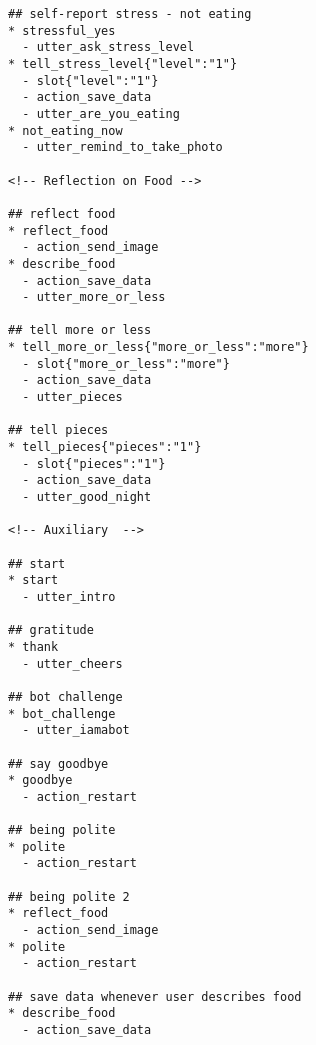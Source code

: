 \begin{lstlisting}
## self-report stress - not eating
* stressful_yes
  - utter_ask_stress_level
* tell_stress_level{"level":"1"}
  - slot{"level":"1"}
  - action_save_data
  - utter_are_you_eating
* not_eating_now
  - utter_remind_to_take_photo

<!-- Reflection on Food -->

## reflect food
* reflect_food
  - action_send_image
* describe_food
  - action_save_data
  - utter_more_or_less

## tell more or less
* tell_more_or_less{"more_or_less":"more"}
  - slot{"more_or_less":"more"}
  - action_save_data
  - utter_pieces

## tell pieces
* tell_pieces{"pieces":"1"}
  - slot{"pieces":"1"}
  - action_save_data
  - utter_good_night

<!-- Auxiliary  -->

## start
* start
  - utter_intro

## gratitude
* thank
  - utter_cheers

## bot challenge
* bot_challenge
  - utter_iamabot

## say goodbye
* goodbye
  - action_restart

## being polite
* polite
  - action_restart

## being polite 2
* reflect_food
  - action_send_image
* polite
  - action_restart

## save data whenever user describes food
* describe_food
  - action_save_data
\end{lstlisting}
